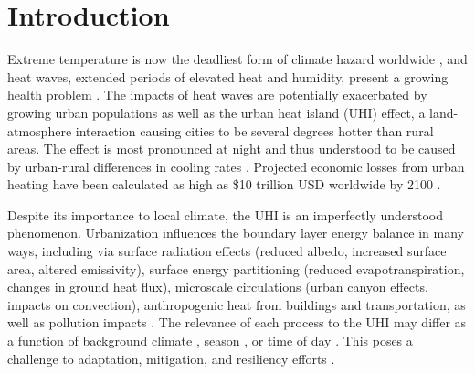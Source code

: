 %
\chapter{Introduction}
\label{chap:intro}

Extreme temperature is now the deadliest form of climate hazard worldwide \citep{wmo}, and heat waves, extended periods of elevated heat and humidity, present a growing health problem \citep{ipcc}. The impacts of heat waves are potentially exacerbated by growing urban populations as well as the urban heat island (UHI) effect, a land-atmosphere interaction causing cities to be several degrees hotter than rural areas. The effect is most pronounced at night and thus understood to be caused by urban-rural differences in cooling rates \citep{oke82}. Projected economic losses from urban heating have been calculated as high as \$10 trillion USD worldwide by 2100 \citep{estrada2017global}.

Despite its importance to local climate, the UHI is an imperfectly understood phenomenon. Urbanization influences the boundary layer energy balance in many ways, including via surface radiation effects (reduced albedo, increased surface area, altered emissivity), surface energy partitioning (reduced evapotranspiration, changes in ground heat flux), microscale circulations (urban canyon effects, impacts on convection), anthropogenic heat from buildings and transportation, as well as pollution impacts \citep{arnfield2003two, oke1982energetic}. The relevance of each process to the UHI may differ as a function of background climate \citep{zhao2014strong}, season \citep{arnfield2003two}, or time of day \citep{peng2011surface}. This poses a challenge to adaptation, mitigation, and resiliency efforts \citep{stone2012managing}.

